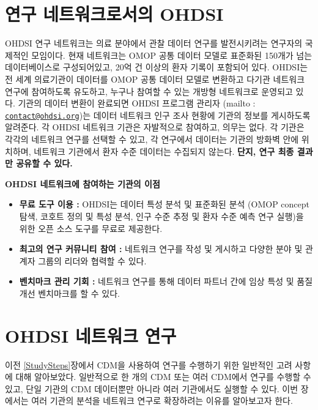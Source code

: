 \documentclass[10.5pt]{book}
\providecommand{\tightlist}{%
  \setlength{\itemsep}{0pt}\setlength{\parskip}{0pt}}
\theoremstyle{definition}
\theoremstyle{definition}
\theoremstyle{definition}
\theoremstyle{remark}
\let\BeginKnitrBlock\begin \let\EndKnitrBlock\end
\begin{document}
\section{연구 네트워크로서의 OHDSI}\label{--ohdsi}


OHDSI 연구 네트워크는 의료 분야에서 관찰 데이터 연구를 발전시키려는
연구자의 국제적인 모임이다. 현재 네트워크는 OMOP 공통 데이터 모델로
표준화된 150개가 넘는 데이터베이스로 구성되어있고, 20억 건 이상의 환자
기록이 포함되어 있다. OHDSI는 전 세계 의료기관이 데이터를 OMOP 공통
데이터 모델로 변환하고 다기관 네트워크 연구에 참여하도록 유도하고,
누구나 참여할 수 있는 개방형 네트워크로 운영되고 있다. 기관의 데이터
변환이 완료되면 OHDSI 프로그램 관리자 (mailto :
\href{mailto:contact@ohdsi.org}{\nolinkurl{contact@ohdsi.org}})는 데이터
네트워크 인구 조사 현황에 기관의 정보를 게시하도록 알려준다. 각 OHDSI
네트워크 기관은 자발적으로 참여하고, 의무는 없다. 각 기관은 각각의
네트워크 연구를 선택할 수 있고, 각 연구에서 데이터는 기관의 방화벽 안에
위치하며, 네트워크 기관에서 환자 수준 데이터는 수집되지 않는다.
\textbf{단지, 연구 최종 결과만 공유할 수 있다.}

\BeginKnitrBlock{rmdimportant}
\textbf{OHDSI 네트워크에 참여하는 기관의 이점}

\begin{itemize}
\tightlist
\item
  \textbf{무료 도구 이용 :} OHDSI는 데이터 특성 분석 및 표준화된 분석
  (OMOP concept 탐색, 코호트 정의 및 특성 분석, 인구 수준 추정 및 환자
  수준 예측 연구 실행)을 위한 오픈 소스 도구를 무료로 제공한다.
\item
  \textbf{최고의 연구 커뮤니티 참여 :} 네트워크 연구를 작성 및 게시하고
  다양한 분야 및 관계자 그룹의 리더와 협력할 수 있다.
\item
  \textbf{벤치마크 관리 기회 :} 네트워크 연구를 통해 데이터 파트너 간에
  임상 특성 및 품질 개선 벤치마크를 할 수 있다.
\end{itemize}
\EndKnitrBlock{rmdimportant}

\section{OHDSI 네트워크 연구}\label{ohdsi--}


이전 \ref{StudySteps}장에서 CDM을 사용하여 연구를 수행하기 위한 일반적인
고려 사항에 대해 알아보았다. 일반적으로 한 개의 CDM 또는 여러 CDM에서
연구를 수행할 수 있고, 단일 기관의 CDM 데이터뿐만 아니라 여러 기관에서도
실행할 수 있다. 이번 장에서는 여러 기관의 분석을 네트워크 연구로
확장하려는 이유를 알아보고자 한다.
\end{document}
